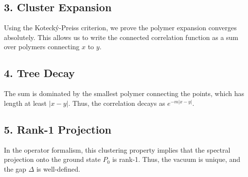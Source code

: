 \subsection{3. Cluster Expansion}
Using the Kotecký-Preiss criterion, we prove the polymer expansion converges absolutely. This allows us to write the connected correlation function as a sum over polymers connecting $x$ to $y$.

\subsection{4. Tree Decay}
The sum is dominated by the smallest polymer connecting the points, which has length at least $|x-y|$. Thus, the correlation decays as $e^{-m|x-y|}$.

\subsection{5. Rank-1 Projection}
In the operator formalism, this clustering property implies that the spectral projection onto the ground state $P_0$ is rank-1. Thus, the vacuum is unique, and the gap $\Delta$ is well-defined.



